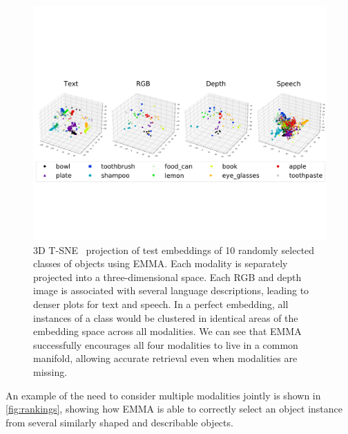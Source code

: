 \documentclass[10pt]{article} %
\newcommand{\ours}{\textsc{EMMA}}
\begin{document}
\begin{figure}[h]
\centering
\includegraphics[width=.99\columnwidth]{Figures/3D-tsne-exp-supcon-emma-lard-64-relu-SGD-0.001-unique_objects-gold-no_neg_sampling-1024-trimmed.pdf}
\caption{3D T-SNE~\citep{van2008tsne} projection of test embeddings of 10 randomly selected classes of objects using \ours{}. Each modality is separately projected into a three-dimensional space. Each RGB and depth image is associated with several language descriptions, leading to denser plots for text and speech. In a perfect embedding, all instances of a class would be clustered in identical areas of the embedding space across all modalities. We can see that \ours{} successfully encourages all four modalities to live in a common manifold, allowing accurate retrieval even when modalities are missing.
}

\label{fig:3d-tsne}
\end{figure}

An example of the need to consider multiple modalities jointly is shown in \cref{fig:rankings}, showing how EMMA is able to correctly select an object instance from several similarly shaped and describable objects. 
\end{document}

